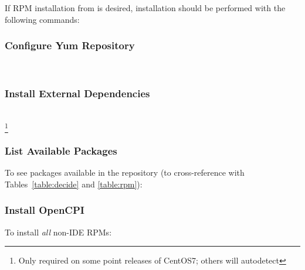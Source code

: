 If RPM installation from \yumrepo is desired, installation should be performed with the following commands:
\subsubsection{Configure Yum Repository}
\\

\subsubsection{Install External Dependencies}
\\
\footnote{Only required on some point releases of CentOS7; others will autodetect} %

\subsubsection{List Available Packages}
To see packages available in the repository (to cross-reference with Tables~\ref{table:decide} and \ref{table:rpm}):\\

\subsubsection{Install OpenCPI}
To install \textit{all} non-IDE RPMs: \\

